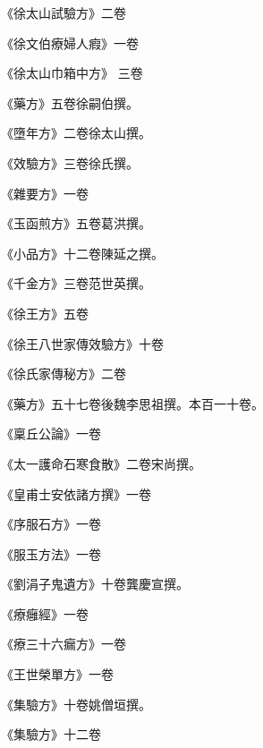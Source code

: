\begin{pinyinscope}
 《徐太山試驗方》二卷



 《徐文伯療婦人瘕》一卷



 《徐太山巾箱中方》
 三卷



 《藥方》五卷徐嗣伯撰。



 《墮年方》二卷徐太山撰。



 《效驗方》三卷徐氏撰。



 《雜要方》一卷



 《玉函煎方》五卷葛洪撰。



 《小品方》十二卷陳延之撰。



 《千金方》三卷范世英撰。



 《徐王方》五卷



 《徐王八世家傳效驗方》十卷



 《徐氏家傳秘方》二卷



 《藥方》五十七卷後魏李思祖撰。本百一十卷。



 《稟丘公論》一卷



 《太一護命石寒食散》二卷宋尚撰。



 《皇甫士安依諸方撰》一卷



 《序服石方》一卷



 《服玉方法》一卷



 《劉涓子鬼遺方》十卷龔慶宣撰。



 《療癰經》一卷



 《療三十六瘺方》一卷



 《王世榮單方》一卷



 《集驗方》十卷姚僧垣撰。



 《集驗方》十二卷




\end{pinyinscope}
